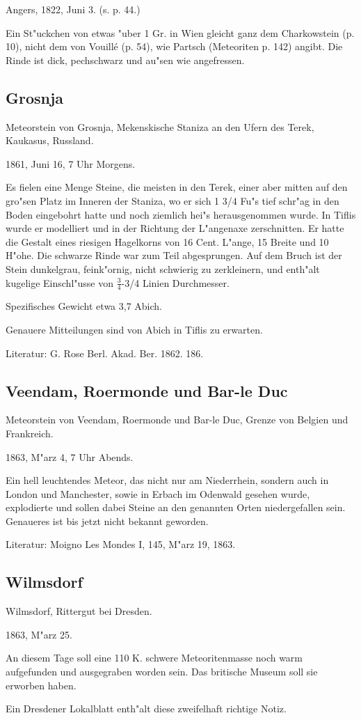 \documentclass[a4paper, 11pt, oneside]{article}
\begin{document}
Angers, 1822, Juni 3. (s. p. 44.)

Ein St"uckchen von etwas "uber 1 Gr. in Wien gleicht ganz dem Charkowstein (p. 10), nicht dem von Vouillé (p. 54), wie Partsch (Meteoriten p. 142) angibt. Die Rinde ist dick, pechschwarz und au"sen wie angefressen.

\subsection{Grosnja}

Meteorstein von Grosnja, Mekenskische Staniza an den Ufern des Terek, Kaukasus, Russland.

1861, Juni 16, 7 Uhr Morgens.

Es fielen eine Menge Steine, die meisten in den Terek, einer aber mitten auf den gro"sen Platz im Inneren der Staniza, wo er sich 1 3/4 Fu"s tief schr"ag in den Boden eingebohrt hatte und noch ziemlich hei"s herausgenommen wurde. In Tiflis wurde er modelliert und in der Richtung der L"angenaxe zerschnitten. Er hatte die Gestalt eines riesigen Hagelkorns von 16 Cent. L"ange, 15 Breite und 10 H"ohe. Die schwarze Rinde war zum Teil abgesprungen. Auf dem Bruch ist der Stein dunkelgrau, feink"ornig, nicht schwierig zu zerkleinern, und enth"alt kugelige Einschl"usse von $\frac{3}{4}$-3/4 Linien Durchmesser.

Spezifisches Gewicht etwa 3,7 Abich.

Genauere Mitteilungen sind von Abich in Tiflis zu erwarten.

Literatur: G. Rose Berl. Akad. Ber. 1862. 186.

\subsection{Veendam, Roermonde und Bar-le Duc}

Meteorstein von Veendam, Roermonde und Bar-le Duc, Grenze von Belgien und Frankreich.

1863, M"arz 4, 7 Uhr Abends.

Ein hell leuchtendes Meteor, das nicht nur am Niederrhein, sondern auch in London und Manchester, sowie in Erbach im Odenwald gesehen wurde, explodierte und sollen dabei Steine an den genannten Orten niedergefallen sein. Genaueres ist bis jetzt nicht bekannt geworden.

Literatur: Moigno Les Mondes I, 145, M"arz 19, 1863.

\subsection{Wilmsdorf}

Wilmsdorf, Rittergut bei Dresden.

1863, M"arz 25.

An diesem Tage soll eine 110 K. schwere Meteoritenmasse noch warm aufgefunden und ausgegraben worden sein. Das britische Museum soll sie erworben haben.

Ein Dresdener Lokalblatt enth"alt diese zweifelhaft richtige Notiz.
\clearpage
\end{document}
